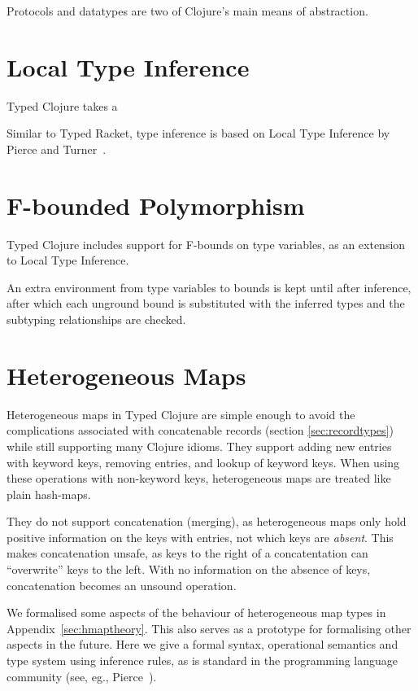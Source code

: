 Protocols and datatypes are two of Clojure's main means of abstraction.



\section{Local Type Inference}

Typed Clojure takes a

Similar to Typed Racket, type inference is based on Local Type Inference
by Pierce and Turner~\cite{PT00}.

\section{F-bounded Polymorphism}

Typed Clojure includes support for F-bounds on type variables\cite{CCHOM89}, as an extension
to Local Type Inference. 

An extra environment from type variables to bounds is kept until after inference,
after which each unground bound is substituted with the inferred types and the
subtyping relationships are checked.

\section{Heterogeneous Maps}
\label{ref:designhmap}

Heterogeneous maps in Typed Clojure are simple enough to avoid
the complications associated with concatenable records (section \ref{sec:recordtypes})
while still supporting many Clojure idioms.
They support adding new entries with keyword keys, removing entries,
and lookup of keyword keys.
When using these operations with non-keyword keys, heterogeneous maps
are treated like plain hash-maps.

They do not support concatenation (merging), as heterogeneous maps
only hold positive information on the keys with entries, not
which keys are \emph{absent}.
This makes concatenation unsafe, as keys to the right of a
concatentation can ``overwrite'' keys to the left. With no information
on the absence of keys, concatenation becomes an unsound operation.

We formalised some aspects of the behaviour of heterogeneous map types in Appendix~\ref{sec:hmaptheory}.
This also serves as a prototype for formalising other aspects in the future.
Here we give a formal syntax, operational semantics and type system using inference
rules, as is standard in the programming language community (see, eg., Pierce~\cite{Pie02}).

